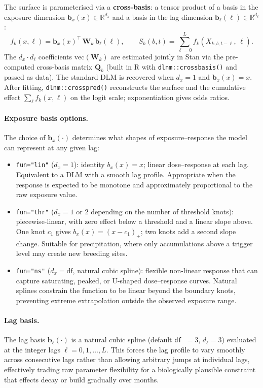 \documentclass[12pt,a4paper]{article}
\begin{document}
The surface is parameterised via a \textbf{cross-basis}: a tensor product of a basis in the exposure dimension $\mathbf{b}_x(x) \in \mathbb{R}^{d_x}$ and a basis in the lag dimension $\mathbf{b}_\ell(\ell) \in \mathbb{R}^{d_\ell}$:
\begin{equation}
  f_k(x,\ell) = \mathbf{b}_x(x)^\top\,\mathbf{W}_k\,\mathbf{b}_\ell(\ell), \qquad
  S_k(b,t) = \sum_{\ell=0}^{L} f_k\!\left(X_{k,b,t-\ell},\,\ell\right).
\end{equation}
The $d_x \cdot d_\ell$ coefficients $\mathrm{vec}(\mathbf{W}_k)$ are estimated jointly in Stan via the pre-computed cross-basis matrix $\mathbf{Q}_k$ (built in R with \texttt{dlnm::crossbasis()} and passed as data).
The standard DLM is recovered when $d_x = 1$ and $\mathbf{b}_x(x) = x$.
After fitting, \texttt{dlnm::crosspred()} reconstructs the surface and the cumulative effect $\sum_\ell f_k(x,\ell)$ on the logit scale; exponentiation gives odds ratios.

\paragraph{Exposure basis options.}
The choice of $\mathbf{b}_x(\cdot)$ determines what shapes of exposure--response the model can represent at any given lag:
\begin{itemize}
  \item \texttt{fun="lin"} ($d_x = 1$): identity $b_x(x) = x$; linear dose--response at each lag. Equivalent to a DLM with a smooth lag profile. Appropriate when the response is expected to be monotone and approximately proportional to the raw exposure value.
  \item \texttt{fun="thr"} ($d_x = 1$ or $2$ depending on the number of threshold knots): piecewise-linear, with zero effect below a threshold and a linear slope above. One knot $c_1$ gives $b_x(x) = (x - c_1)_+$; two knots add a second slope change. Suitable for precipitation, where only accumulations above a trigger level may create new breeding sites.
  \item \texttt{fun="ns"} ($d_x = \text{df}$, natural cubic spline): flexible non-linear response that can capture saturating, peaked, or U-shaped dose--response curves. Natural splines constrain the function to be linear beyond the boundary knots, preventing extreme extrapolation outside the observed exposure range.
\end{itemize}

\paragraph{Lag basis.}
The lag basis $\mathbf{b}_\ell(\cdot)$ is a natural cubic spline (default \texttt{df}~$= 3$, $d_\ell = 3$) evaluated at the integer lags $\ell = 0, 1, \ldots, L$. This forces the lag profile to vary smoothly across consecutive lags rather than allowing arbitrary jumps at individual lags, effectively trading raw parameter flexibility for a biologically plausible constraint that effects decay or build gradually over months.
\end{document}
